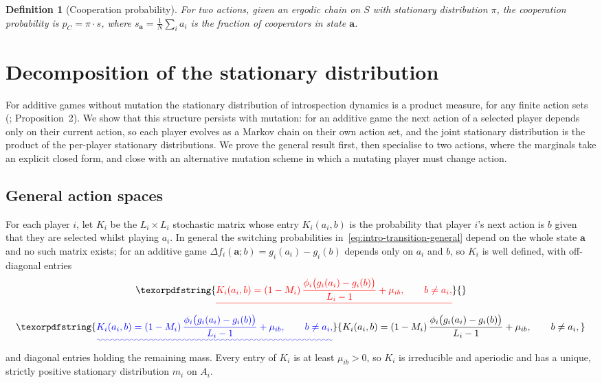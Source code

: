\documentclass[11pt]{article}
\newtheorem{definition}{Definition}
\newcommand{\bfa}{\mathbf{a}}
\newcommand{\bfm}{\mathbf{m}} %
\providecommand{\DIFaddtex}[1]{{\protect\color{blue}\uwave{#1}}} %
\providecommand{\DIFdeltex}[1]{{\protect\color{red}\sout{#1}}}                      %
\providecommand{\DIFaddbegin}{} %
\providecommand{\DIFaddend}{} %
\providecommand{\DIFdelbegin}{} %
\providecommand{\DIFdelend}{} %
\providecommand{\DIFadd}[1]{\texorpdfstring{\DIFaddtex{#1}}{#1}} %
\providecommand{\DIFdel}[1]{\texorpdfstring{\DIFdeltex{#1}}{}} %
\newcommand{\DIFscaledelfig}{0.5}
\newlength{\DIFdelgraphicswidth} %
\newlength{\DIFdelgraphicsheight} %
\newcommand{\DIFaddincludegraphics}[2][]{{\color{blue}\fbox{\DIFOincludegraphics[#1]{#2}}}} %
\newcommand{\DIFdelincludegraphics}[2][]{%
\sbox{\DIFdelgraphicsbox}{\DIFOincludegraphics[#1]{#2}}%
\settoboxwidth{\DIFdelgraphicswidth}{\DIFdelgraphicsbox} %
\settoboxtotalheight{\DIFdelgraphicsheight}{\DIFdelgraphicsbox} %
\scalebox{\DIFscaledelfig}{%
\parbox[b]{\DIFdelgraphicswidth}{\usebox{\DIFdelgraphicsbox}\\[-\baselineskip] \rule{\DIFdelgraphicswidth}{0em}}\llap{\resizebox{\DIFdelgraphicswidth}{\DIFdelgraphicsheight}{%
\setlength{\unitlength}{\DIFdelgraphicswidth}%
\begin{picture}(1,1)%
\thicklines\linethickness{2pt} %
{\color[rgb]{1,0,0}\put(0,0){\framebox(1,1){}}}%
{\color[rgb]{1,0,0}\put(0,0){\line( 1,1){1}}}%
{\color[rgb]{1,0,0}\put(0,1){\line(1,-1){1}}}%
\end{picture}%
}\hspace*{3pt}}} %
} %
\DeclareRobustCommand{\DIFaddbegin}{\DIFOaddbegin \let\includegraphics\DIFaddincludegraphics} %
\DeclareRobustCommand{\DIFaddend}{\DIFOaddend \let\includegraphics\DIFOincludegraphics} %
\DeclareRobustCommand{\DIFdelbegin}{\DIFOdelbegin \let\includegraphics\DIFdelincludegraphics} %
\DeclareRobustCommand{\DIFdelend}{\DIFOaddend \let\includegraphics\DIFOincludegraphics} %
\begin{document}
\begin{definition}[Cooperation probability]
For two actions, given an ergodic chain on \(S\) with stationary distribution
\(\pi\), the \emph{cooperation probability} is \(p_C=\pi\cdot s\), where
\(s_\bfa=\frac{1}{N}\sum_i a_i\) is the fraction of cooperators in state \(\bfa\).
\end{definition}

\section{Decomposition of the stationary distribution}\label{sec:decomp}

For additive games without mutation the stationary distribution of
introspection dynamics is a product measure, for any finite action sets
(\cite{couto2023multiplayer}; Proposition~2). We show that this structure
persists with mutation: for an additive game the next action of a selected
player depends only on their current action, so each player evolves as a
Markov chain on their own action set, and the joint stationary distribution
is the product of the per-player stationary distributions. We prove the
general result first, then specialise to two actions, where the marginals
take an explicit closed form, and close with an alternative mutation scheme
in which a mutating player must change action.

\subsection{General action spaces}\label{sec:general}

For each player \(i\), let \(K_i\) be the \(L_i\times L_i\) stochastic matrix
whose entry \(K_i(a_i,b)\) is the probability that player \(i\)'s next action
is \(b\) given that they are selected whilst playing \(a_i\). In general the
switching probabilities in~\eqref{eq:intro-transition-general} depend on the
whole state \(\bfa\) and no such matrix exists; for an additive game
\(\Delta f_i(\bfa;b)=g_i(a_i)-g_i(b)\) depends only on \(a_i\) and \(b\), so
\(K_i\) is well defined, with off-diagonal entries
\DIFdelbegin \[
  \DIFdel{K_i(a_i,b)
  = (1-M_i)\,\frac{\phi_i\bigl(g_i(a_i)-g_i(b)\bigr)}{L_i-1}+\mu_{ib},
  \qquad b\neq a_i,
}\]%
\DIFdelend \DIFaddbegin \begin{equation}\DIFadd{\label{eq:kernel}
  K_i(a_i,b)
  = (1-M_i)\,\frac{\phi_i\bigl(g_i(a_i)-g_i(b)\bigr)}{L_i-1}+\mu_{ib},
  \qquad b\neq a_i,
}\end{equation}\DIFaddend 
and diagonal entries holding the remaining mass. Every entry of \(K_i\) is at
least \(\mu_{ib}>0\), so \(K_i\) is irreducible and aperiodic and has a
unique, strictly positive stationary distribution \DIFdelbegin \DIFdel{\(m_i\) }\DIFdelend \DIFaddbegin \DIFadd{\(\bfm_i\) }\DIFaddend on \(A_i\).
\end{document}
